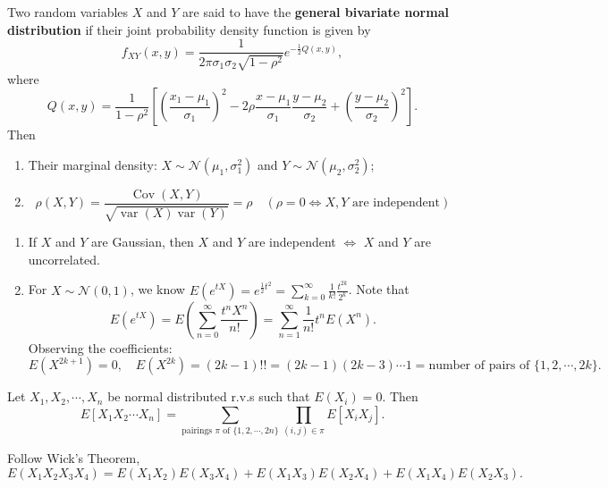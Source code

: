\documentclass[11pt,singlecolumn, openany, citestyle=authoryear]{elegantbook}
\begin{document}
\begin{CJK}{UTF8}{gbsn}
\begin{example}
    Two random variables $X$ and $Y$
    are said to have the \textbf{general bivariate normal distribution} 
    if their joint probability density function is given by
    $$f_{XY}(x,y)=\frac{1}{2\pi \sigma_1\sigma_2\sqrt{1-\rho^2}} 
    e^{-\frac{1}{2}Q(x,y)},
    $$
    where 
    $$
    Q(x,y)=\frac{1}{1-\rho^2}\left[
        \left( \frac{x_1-\mu_1}{\sigma_1}\right)^2 - 2 \rho \frac{x-\mu_1}{\sigma_1}
        \frac{y-\mu_2}{\sigma_2}+\left(\frac{y-\mu_2}{\sigma_2}\right)^2
    \right].
    $$
    Then 
    \begin{enumerate}
        \item Their marginal density: $X\sim \mathcal{N}(\mu_1,\sigma_1^2)$ and 
        $Y\sim \mathcal{N}(\mu_2,\sigma_2^2)$;
        \item $$
        \rho(X,Y)=\frac{\operatorname*{Cov}(X,Y)}
        {\sqrt{\operatorname{var}(X)\operatorname{var}(Y)}}=\rho \quad 
        (\rho = 0 \iff X, Y \text{ are independent})
        $$
    \end{enumerate}
\end{example}
\begin{remark}
    \begin{enumerate}
    \item If $X$ and $Y$ are Gaussian, then $X$ and $Y$ are independent $\iff$ $X$ and $Y$ are 
    uncorrelated.
    \item For $X\sim \mathcal{N}(0,1)$, we know $E(e^{tX})=e^{\frac{1}{2}t^2}=
    \displaystyle \sum_{k=0}^\infty\frac{1}{k!}\frac{t^{2k}}{2^k}$.
    Note that 
    $$
    E(e^{tX}) = E(\sum_{n=0}^\infty\frac{t^nX^n}{n!}) = 
    \sum_{n=1}^\infty \frac{1}{n!}t^n E(X^n).
    $$
    Observing the coefficients:
    $$
    E(X^{2k+1}) = 0, \quad 
    E(X^{2k})=(2k-1)!!=(2k-1)(2k-3)\cdots 1 = 
    \text{number of pairs of } \{1,2,\cdots,2k\}.
    $$
    \end{enumerate}
\end{remark}

\begin{theorem}[Wick]
    Let $X_1,X_2,\cdots,X_n$ be normal distributed r.v.s such that $E(X_i)=0$.
    Then 
    $$
    E[X_1X_2 \cdots X_n]=\sum_{\text{pairings } \pi \text{ of }\{1,2,\cdots,2n\}}
    \prod_{(i,j)\in\pi}E[X_iX_j].
    $$
\end{theorem}
\begin{example}
    Follow Wick's Theorem, $E(X_1X_2X_3X_4)=E(X_1X_2)E(X_3X_4)+E(X_1X_3)E(X_2X_4)+E(X_1X_4)E(X_2X_3).$
\end{example}


\end{CJK}
\end{document}

